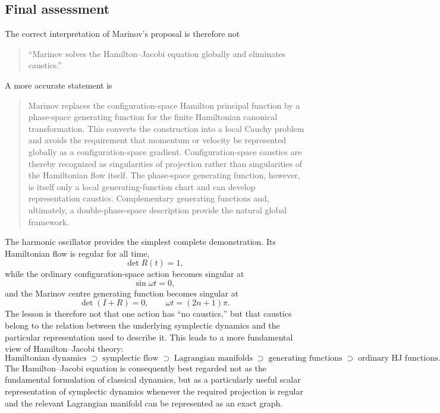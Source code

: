 \subsection{Final assessment}
The correct interpretation of Marinov's proposal is therefore not
\begin{quote}
``Marinov solves the Hamilton--Jacobi equation globally and eliminates
caustics.''
\end{quote}
A more accurate statement is
\begin{quote}
Marinov replaces the configuration-space Hamilton principal function by a
phase-space generating function for the finite Hamiltonian canonical
transformation.  This converts the construction into a local Cauchy problem
and avoids the requirement that momentum or velocity be represented globally
as a configuration-space gradient.  Configuration-space caustics are thereby
recognized as singularities of projection rather than singularities of the
Hamiltonian flow itself.  The phase-space generating function, however, is
itself only a local generating-function chart and can develop representation
caustics.  Complementary generating functions and, ultimately, a
double-phase-space description provide the natural global framework.
\end{quote}
The harmonic oscillator provides the simplest complete demonstration.  Its
Hamiltonian flow is regular for all time,
\begin{equation}
 \det R(t)=1,
\end{equation}
while the ordinary configuration-space action becomes singular at
\begin{equation}
 \sin\omega t=0,
\end{equation}
and the Marinov centre generating function becomes singular at
\begin{equation}
 \det(I+R)=0,
 \qquad
 \omega t=(2n+1)\pi.
\end{equation}
The lesson is therefore not that one action has ``no caustics,'' but that
caustics belong to the relation between the underlying symplectic dynamics
and the particular representation used to describe it.
This leads to a more fundamental view of Hamilton--Jacobi theory:
\begin{equation}
 \boxed{
 \text{Hamiltonian dynamics}
 \;\supset\;
 \text{symplectic flow}
 \;\supset\;
 \text{Lagrangian manifolds}
 \;\supset\;
 \text{generating functions}
 \;\supset\;
 \text{ordinary HJ functions}.
 }
\end{equation}
The Hamilton--Jacobi equation is consequently best regarded not as the
fundamental formulation of classical dynamics, but as a particularly useful
scalar representation of symplectic dynamics whenever the required
projection is regular and the relevant Lagrangian manifold can be represented
as an exact graph.
